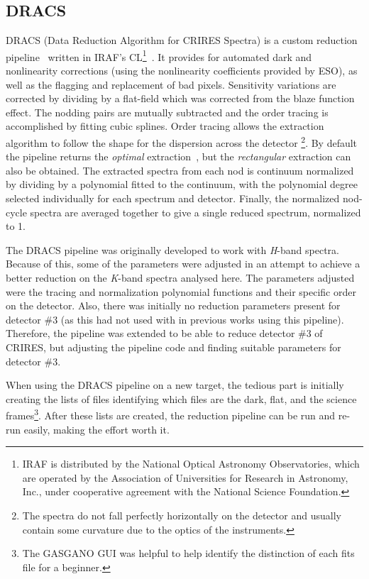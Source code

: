 \subsection{{DRACS}}
\label{subsec:dracs}
{DRACS} (Data Reduction Algorithm for {CRIRES} Spectra) is a custom reduction pipeline~\citep{figueira_radial_2010} written in {IRAF}'s CL\footnote{{IRAF} is distributed by the National Optical Astronomy Observatories, which are operated by the Association of Universities for Research in Astronomy, {Inc.}, under cooperative agreement with the National Science Foundation.}~\citep{tody_iraf_1993}.
It provides for automated dark and nonlinearity corrections (using the nonlinearity coefficients provided by {ESO}), as well as the flagging and replacement of bad pixels.
Sensitivity variations are corrected by dividing by a flat-field which was corrected from the blaze function effect.
The nodding pairs are mutually subtracted and the order tracing is accomplished by fitting cubic splines.
Order tracing allows the extraction algorithm to follow the shape for the dispersion across the detector \footnote{The spectra do not fall perfectly horizontally on the detector and usually contain some curvature due to the optics of the instruments.}.
By default the pipeline returns the \emph{optimal} extraction~\citep{horne_optimal_1986}, but the \emph{rectangular} extraction can also be obtained.
The extracted spectra from each nod is continuum normalized by dividing by a polynomial fitted to the continuum, with the polynomial degree selected individually for each spectrum and detector.
Finally, the normalized nod-cycle spectra are averaged together to give a single reduced spectrum, normalized to 1.

The {DRACS} pipeline was originally developed to work with \emph{H}-band spectra.
Because of this, some of the parameters were adjusted in an attempt to achieve a better reduction on the \emph{K}-band spectra analysed here.
The parameters adjusted were the tracing and normalization polynomial functions and their specific order on the detector.
Also, there was initially no reduction parameters present for detector \#3 (as this had not used with in previous works using this pipeline).
Therefore, the pipeline was extended to be able to reduce detector \#3 of CRIRES, but adjusting the pipeline code and finding suitable parameters for detector \#3.

When using the {DRACS} pipeline on a new target, the tedious part is initially creating the lists of files identifying which files are the dark, flat, and the science frames\footnote{The GASGANO GUI was helpful to help identify the distinction of each fits file for a beginner.}.
After these lists are created, the reduction pipeline can be run and re-run easily, making the effort worth it.

